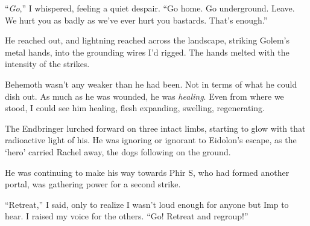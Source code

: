 ``\emph{Go},'' I whispered, feeling a quiet despair.  ``Go home.  Go underground.  Leave.  We hurt you as badly as we've ever hurt you bastards.  That's enough.''



He reached out, and lightning reached across the landscape, striking Golem's metal hands, into the grounding wires I'd rigged.  The hands melted with the intensity of the strikes.



Behemoth wasn't any weaker than he had been.  Not in terms of what he could dish out. As much as he was wounded, he was \emph{healing}.  Even from where we stood, I could see him healing, flesh expanding, swelling, regenerating.



The Endbringer lurched forward on three intact limbs, starting to glow with that radioactive light of his.  He was ignoring or ignorant to Eidolon's escape, as the `hero' carried Rachel away, the dogs following on the ground.



He was continuing to make his way towards Phir S, who had formed another portal, was gathering power for a second strike.



``Retreat,'' I said, only to realize I wasn't loud enough for anyone but Imp to hear.  I raised my voice for the others.  ``Go!  Retreat and regroup!''





